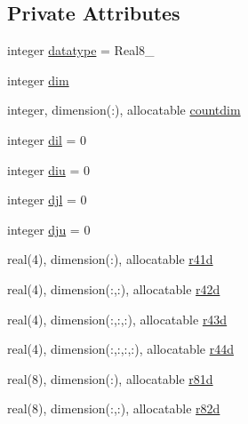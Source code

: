 \subsection*{Private Attributes}
\begin{DoxyCompactItemize}
\item 
integer \mbox{\hyperlink{structmodulenetcdfcf__2__hdf5mohid_1_1t__valuein_ac7b16c4833a303f4b3f0c5c04a5a32db}{datatype}} = Real8\+\_\+
\item 
integer \mbox{\hyperlink{structmodulenetcdfcf__2__hdf5mohid_1_1t__valuein_a7dee30bb003d628c38fa3229f65cbe3a}{dim}}
\item 
integer, dimension(\+:), allocatable \mbox{\hyperlink{structmodulenetcdfcf__2__hdf5mohid_1_1t__valuein_ae8ade5af0d8e96842436207f1f3d4074}{countdim}}
\item 
integer \mbox{\hyperlink{structmodulenetcdfcf__2__hdf5mohid_1_1t__valuein_a895982e2482f97d7ae82e05cae285f8e}{dil}} = 0
\item 
integer \mbox{\hyperlink{structmodulenetcdfcf__2__hdf5mohid_1_1t__valuein_a44fa0acc185b9d436ff204d30322b0a5}{diu}} = 0
\item 
integer \mbox{\hyperlink{structmodulenetcdfcf__2__hdf5mohid_1_1t__valuein_aba7f036ada8fba556cc325fb2ced413a}{djl}} = 0
\item 
integer \mbox{\hyperlink{structmodulenetcdfcf__2__hdf5mohid_1_1t__valuein_a7ebb0864ade7a3968d2733fc83d65d1f}{dju}} = 0
\item 
real(4), dimension(\+:), allocatable \mbox{\hyperlink{structmodulenetcdfcf__2__hdf5mohid_1_1t__valuein_aa738608470d1b1fdba0917a845b6bd8e}{r41d}}
\item 
real(4), dimension(\+:,\+:), allocatable \mbox{\hyperlink{structmodulenetcdfcf__2__hdf5mohid_1_1t__valuein_a173cc0b9967e62e241a2d331c02eefbc}{r42d}}
\item 
real(4), dimension(\+:,\+:,\+:), allocatable \mbox{\hyperlink{structmodulenetcdfcf__2__hdf5mohid_1_1t__valuein_ac98b3e3c69f095823ee0222cbb72182d}{r43d}}
\item 
real(4), dimension(\+:,\+:,\+:,\+:), allocatable \mbox{\hyperlink{structmodulenetcdfcf__2__hdf5mohid_1_1t__valuein_ac948b0075475f095c1d8399a9c9a8357}{r44d}}
\item 
real(8), dimension(\+:), allocatable \mbox{\hyperlink{structmodulenetcdfcf__2__hdf5mohid_1_1t__valuein_af4c4f01ce2c1cbd6d72b865e158cc4ca}{r81d}}
\item 
real(8), dimension(\+:,\+:), allocatable \mbox{\hyperlink{structmodulenetcdfcf__2__hdf5mohid_1_1t__valuein_a86737beebb658c80badb826c74d42c7e}{r82d}}

\end{DoxyCompactItemize}

